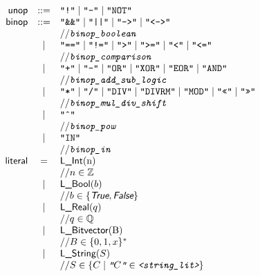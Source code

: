 \documentclass{book}
\begin{document}
\[
\begin{array}{rcl}
\unop &::=& \texttt{"!"} \;|\; \texttt{"-"} \;|\; \texttt{"NOT"} \\
\binop &::=& \texttt{"\&\&"} \;|\; \texttt{"||"} \;|\; \texttt{"-->"} \;|\;  \texttt{"<->"}  \\
 & & \ASTComment{\texttt{binop\_boolean}}\\

 &|& \texttt{"=="} \;|\; \texttt{"!="}  \;|\; \texttt{">"}  \;|\; \texttt{">="} \;|\; \texttt{"<"} \;|\; \texttt{"<="}   \\
 & & \ASTComment{\texttt{binop\_comparison}}\\

 &|& \texttt{"+"} \;|\; \texttt{"-"}  \;|\; \texttt{"OR"}  \;|\; \texttt{"XOR"} \;|\; \texttt{"EOR"} \;|\; \texttt{"AND"}   \\
 & & \ASTComment{\texttt{binop\_add\_sub\_logic}}\\

 &|& \texttt{"*"} \;|\; \texttt{"/"}  \;|\; \texttt{"DIV"}  \;|\; \texttt{"DIVRM"} \;|\; \texttt{"MOD"}  \;|\; \texttt{"<<"}  \;|\; \texttt{">>"}    \\
 & & \ASTComment{\texttt{binop\_mul\_div\_shift}}\\

 &|& \texttt{"\^{}"}   \\
 & & \ASTComment{\texttt{binop\_pow}}\\

 &|& \texttt{"IN"}   \\
 & & \ASTComment{\texttt{binop\_in}}\\

\literal &=& \lint($n$) \\
 & & \ASTComment{$n \in \Z$}\\
 &|& \lbool(b) \\
 & & \ASTComment{$b \in \{\True, \False\}$}\\
 &|& \lreal(q)  \\
 & & \ASTComment{$q \in \Q$}\\
 &|& \lbitvector($B$)   \\
 & & \ASTComment{$B \in \{0, 1, x\}^*$}\\
 &|& \lstring(S)\\
 & & \ASTComment{$S \in \{C \;|\; \texttt{"$C$"} \in \texttt{<string\_lit>}\} $}\\
\end{array}
\]
\end{document}
